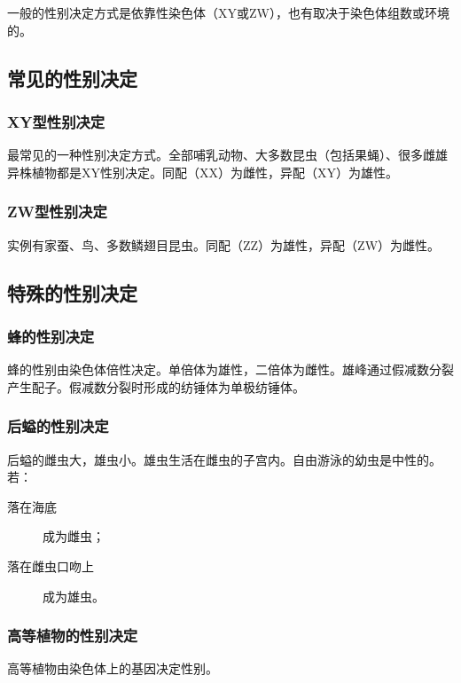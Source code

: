一般的性别决定方式是依靠性染色体（XY或ZW），也有取决于染色体组数或环境的。

\subsection{常见的性别决定}

\subsubsection{XY型性别决定}

最常见的一种性别决定方式。全部哺乳动物、大多数昆虫（包括果蝇）、很多雌雄异株植物都是XY性别决定。同配（XX）为雌性，异配（XY）为雄性。

\subsubsection{ZW型性别决定}

实例有家蚕、鸟、多数鳞翅目昆虫。同配（ZZ）为雄性，异配（ZW）为雌性。

\subsection{特殊的性别决定}

\subsubsection{蜂的性别决定}

蜂的性别由染色体倍性决定。单倍体为雄性，二倍体为雌性。雄峰通过假减数分裂产生配子。假减数分裂时形成的纺锤体为单极纺锤体。

\subsubsection{后螠的性别决定}

后螠的雌虫大，雄虫小。雄虫生活在雌虫的子宫内。自由游泳的幼虫是中性的。若：

\begin{description}
	\item[落在海底] 成为雌虫；
	\item[落在雌虫口吻上] 成为雄虫。
\end{description}

\subsubsection{高等植物的性别决定}

高等植物由染色体上的基因决定性别。

